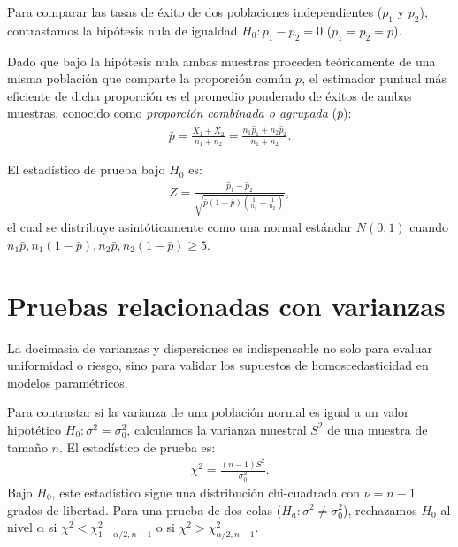 \begin{teorema}
	Para comparar las tasas de éxito de dos poblaciones independientes ($p_1$ y $p_2$), contrastamos la hipótesis nula de igualdad $H_0: p_1 - p_2 = 0$ ($p_1 = p_2 = p$).
	
	Dado que bajo la hipótesis nula ambas muestras proceden teóricamente de una misma población que comparte la proporción común $p$, el estimador puntual más eficiente de dicha proporción es el promedio ponderado de éxitos de ambas muestras, conocido como \emph{proporción combinada o agrupada} ($\bar{p}$):
	\begin{align}
		\bar{p} = \frac{X_1 + X_2}{n_1 + n_2} = \frac{n_1 \hat{p}_1 + n_2 \hat{p}_2}{n_1 + n_2}.
		\label{eq:prop_combinada}
	\end{align}
	
	El estadístico de prueba bajo $H_0$ es:
	\begin{align}
		Z = \frac{\hat{p}_1 - \hat{p}_2}{\sqrt{\bar{p}(1-\bar{p})\left(\frac{1}{n_1} + \frac{1}{n_2}\right)}},
	\end{align}
	el cual se distribuye asintóticamente como una normal estándar $N(0,1)$ cuando $n_1 \bar{p}, n_1(1-\bar{p}), n_2 \bar{p}, n_2(1-\bar{p}) \geq 5$.
\end{teorema}

\section{Pruebas relacionadas con varianzas}

La docimasia de varianzas y dispersiones es indispensable no solo para evaluar uniformidad o riesgo, sino para validar los supuestos de homoscedasticidad en modelos paramétricos.

\begin{teorema}
	Para contrastar si la varianza de una población normal es igual a un valor hipotético $H_0: \sigma^2 = \sigma_0^2$, calculamos la varianza muestral $S^2$ de una muestra de tamaño $n$. El estadístico de prueba es:
	\begin{align}
		\chi^2 = \frac{(n-1)S^2}{\sigma_0^2}.
	\end{align}
	Bajo $H_0$, este estadístico sigue una distribución chi-cuadrada con $\nu = n - 1$ grados de libertad.
	Para una prueba de dos colas ($H_a: \sigma^2 \neq \sigma_0^2$), rechazamos $H_0$ al nivel $\alpha$ si $\chi^2 < \chi^2_{1-\alpha/2, n-1}$ o si $\chi^2 > \chi^2_{\alpha/2, n-1}$.
\end{teorema}

